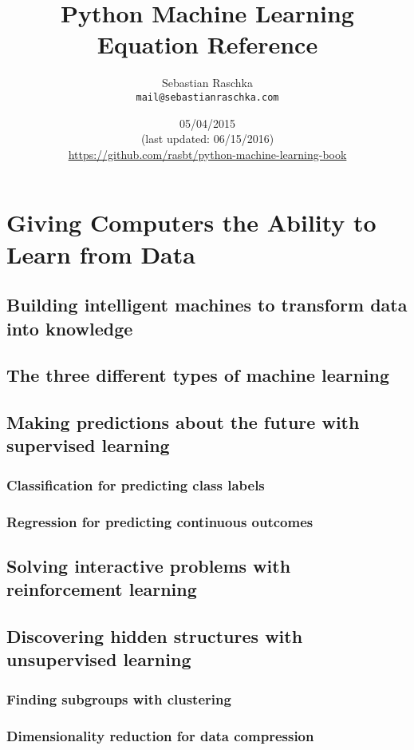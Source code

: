 \documentclass{report}
\title{Python Machine Learning\\ Equation Reference}
\author{Sebastian Raschka \\ \texttt{mail@sebastianraschka.com}}
\date{05\slash 04\slash 2015 \\ (last updated: 06\slash 15\slash 2016) \\ \href{https://github.com/rasbt/python-machine-learning-book}{https://github.com/rasbt/python-machine-learning-book }}
\begin{document}

\maketitle %









\chapter{Giving Computers the Ability to Learn from Data}

\section{Building intelligent machines to transform data into knowledge}
\section{The three different types of machine learning}
\section{Making predictions about the future with supervised learning}
\subsection{Classification for predicting class labels}
\subsection{Regression for predicting continuous outcomes}
\section{Solving interactive problems with reinforcement learning}
\section{Discovering hidden structures with unsupervised learning}
\subsection{Finding subgroups with clustering}
\subsection{Dimensionality reduction for data compression}
\end{document}
